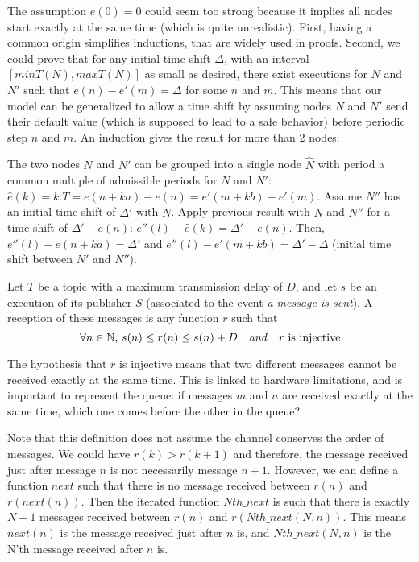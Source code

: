 The assumption $e(0) = 0$ could seem too strong because it implies all nodes start exactly at the same time (which is quite unrealistic). First, having a common origin simplifies inductions, that are widely used in proofs. 
Second, we could prove that for any initial time shift $\Delta$, with an interval $[minT(N), maxT(N)]$ as small as desired, there exist executions for $N$ and $N'$ such that \mbox{$e(n) - e'(m) = \Delta$} for some $n$ and $m$.
This means that our model can be generalized to allow a time shift by assuming nodes $N$ and $N'$ send their default value (which is supposed to lead to a safe behavior) before periodic step $n$ and $m$.
An induction gives the result for more than 2 nodes:

The two nodes $N$ and $N'$ can be grouped into a single node $\hat{N}$ with period a common multiple of admissible periods for $N$ and $N'$: $\hat e(k) = k.T = e(n+ka) - e(n) = e'(m+kb) - e'(m)$.
Assume $N''$ has an initial time shift of $\Delta '$ with $N$. Apply previous result with $\hat N$ and $N''$ for a time shift of $\Delta ' - e(n)$: $e''(l) - \hat e(k) = \Delta ' - e(n)$. Then, $e''(l) - e(n+ka) = \Delta '$ and $e''(l) - e'(m+kb) = \Delta' - \Delta$ (initial time shift between $N'$ and $N''$).

\begin{defin}\label{reception}

Let $T$ be a topic with a maximum transmission delay of $D$, and let $s$ be an execution of its publisher $S$ (associated to the event \emph{a message is sent}). 
A reception of these messages is any function $r$ such that
\[ \forall n \in \mathbb{N}, \, s(n) \leq r(n) \leq s(n) + D \quad 
\textrm{\emph{and}$\quad r$ is injective} \]
\end{defin}

The hypothesis that $r$ is injective means that two different messages cannot be received exactly at the same time. This is linked to hardware limitations, and is important to represent the queue: if messages $m$ and $n$ are received exactly at the same time, which one comes before the other in the queue?   

Note that this definition does not assume the channel conserves the order of messages. We could have $r(k) > r(k+1)$ and therefore, the message received just after message $n$ is not necessarily message $n+1$.
However, we can define a function $next$ such that there is no message received between $r(n)$ and $r(next(n))$.
Then the iterated function $Nth\_next$ is such that there is exactly $N-1$ messages received between $r(n)$ and $r(Nth\_next(N, n))$.
This means $next(n)$ is the message received just after $n$ is, and $Nth\_next(N, n)$ is the N'th message received after $n$ is.

